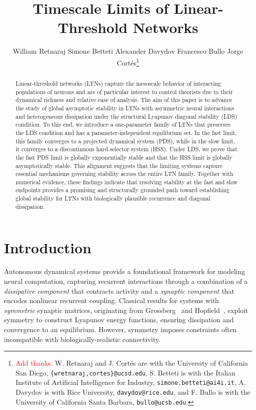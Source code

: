 \documentclass[letterpaper, conference]{ieeeconf}
\newcommand{\red}[1]{\textcolor{red}{#1}}
\newcommand{\1}{\mathbf{1}}
\begin{document}
\title{Timescale Limits of Linear-Threshold Networks}

\author{
William Retnaraj \quad Simone Betteti \quad Alexander Davydov \quad Francesco Bullo \quad Jorge Cort\'es\thanks{\red{Add thanks.} W. Retnaraj and J. Cort\'es are with the University of California San Diego, {\tt \footnotesize \{wretnaraj,cortes\}@ucsd.edu}, S. Betteti is with the Italian Institute of Artificial Intelligence for Industry, {\tt \footnotesize simone.betteti@ai4i.it}, A. Davydov is with Rice University, {\tt \footnotesize davydov@rice.edu}, and F. Bullo is with the University of California Santa Barbara,
{\tt \footnotesize bullo@ucsb.edu}.
}}
\maketitle

\begin{abstract}
Linear-threshold networks (LTNs) capture the mesoscale behavior of interacting populations of neurons and are of particular interest to control theorists due to their dynamical richness and relative ease of analysis. 
The aim of this paper is to advance the study of global asymptotic stability in LTNs with asymmetric neural interactions and heterogeneous dissipation under the structural Lyapunov diagonal stability (LDS) condition. 
To this end, we introduce a one-parameter family of LTNs that preserves the LDS condition and has a parameter-independent equilibrium set. 
In the fast limit, this family converges to a projected dynamical system (PDS), while in the slow limit, it converges to a discontinuous hard-selector system (HSS).
Under LDS, we prove that the fast PDS limit is globally exponentially stable and that the HSS limit is globally asymptotically stable. 
This alignment suggests that the limiting systems capture essential mechanisms governing stability across the entire LTN family. 
Together with numerical evidence, these findings indicate that resolving stability at the fast and slow endpoints provides a promising and structurally grounded path toward establishing global stability for LTNs with biologically plausible recurrence and diagonal dissipation.
\end{abstract}



\section{Introduction}
Autonomous dynamical systems provide a foundational framework for modeling neural computation, capturing recurrent interactions through a combination of a \emph{dissipative component} that contracts activity and a \emph{synaptic component} that encodes nonlinear recurrent coupling.
Classical results for systems with \emph{symmetric} synaptic matrices, originating from Grossberg~\cite{CMA-GS:83} and Hopfield~\cite{HJJ:82,HJJ:84}, exploit symmetry to construct Lyapunov energy functions, ensuring dissipation and convergence to an equilibrium. 
However, symmetry imposes constraints often incompatible with biologically-realistic connectivity.
\end{document}
